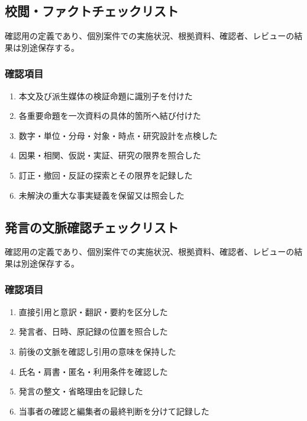 \documentclass[a4paper,11pt]{article}
\begin{document}
\subsection{校閲・ファクトチェックリスト}
\par 確認用の定義であり、個別案件での実施状況、根拠資料、確認者、レビューの結果は別途保存する。\par\medskip
\subsubsection*{確認項目}
\begin{enumerate}[leftmargin=2em,itemsep=0.3em]
\item 本文及び派生媒体の検証命題に識別子を付けた\par
\item 各重要命題を一次資料の具体的箇所へ結び付けた\par
\item 数字・単位・分母・対象・時点・研究設計を点検した\par
\item 因果・相関、仮説・実証、研究の限界を照合した\par
\item 訂正・撤回・反証の探索とその限界を記録した\par
\item 未解決の重大な事実疑義を保留又は照会した\par
\end{enumerate}
\subsection{発言の文脈確認チェックリスト}
\par 確認用の定義であり、個別案件での実施状況、根拠資料、確認者、レビューの結果は別途保存する。\par\medskip
\subsubsection*{確認項目}
\begin{enumerate}[leftmargin=2em,itemsep=0.3em]
\item 直接引用と意訳・翻訳・要約を区分した\par
\item 発言者、日時、原記録の位置を照合した\par
\item 前後の文脈を確認し引用の意味を保持した\par
\item 氏名・肩書・匿名・利用条件を確認した\par
\item 発言の整文・省略理由を記録した\par
\item 当事者の確認と編集者の最終判断を分けて記録した\par
\end{enumerate}
\end{document}
